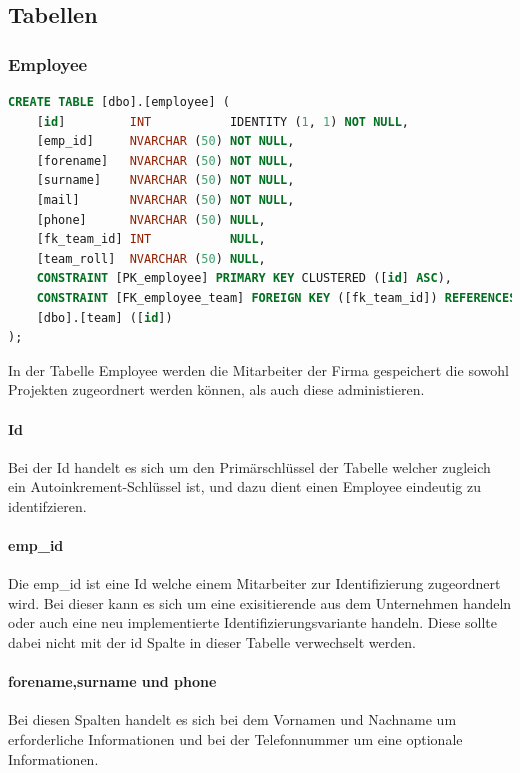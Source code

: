\documentclass{article}
\begin{document}
\newpage

\subsection{Tabellen}

\subsubsection{Employee}
\label{subsubsec:Employee}
\begin{lstlisting}[language=Sql, caption= Create Table Statement für Employee Table]
    CREATE TABLE [dbo].[employee] (
    [id]         INT           IDENTITY (1, 1) NOT NULL,
    [emp_id]     NVARCHAR (50) NOT NULL,
    [forename]   NVARCHAR (50) NOT NULL,
    [surname]    NVARCHAR (50) NOT NULL,
    [mail]       NVARCHAR (50) NOT NULL,
    [phone]      NVARCHAR (50) NULL,
    [fk_team_id] INT           NULL,
    [team_roll]  NVARCHAR (50) NULL,
    CONSTRAINT [PK_employee] PRIMARY KEY CLUSTERED ([id] ASC),
    CONSTRAINT [FK_employee_team] FOREIGN KEY ([fk_team_id]) REFERENCES 
    [dbo].[team] ([id])
);
        \end{lstlisting}

In der Tabelle Employee werden die Mitarbeiter der Firma gespeichert die sowohl
Projekten zugeordnert werden können, als auch diese administieren.
\paragraph{Id}
\label{paragraph:id}
Bei der Id handelt es sich um den Primärschlüssel der Tabelle welcher zugleich
ein Autoinkrement-Schlüssel ist, und dazu dient einen Employee eindeutig zu
identifzieren.

\paragraph{emp\_id} Die emp\_id ist eine Id welche einem Mitarbeiter zur Identifizierung
zugeordnert wird. Bei dieser kann es sich um eine exisitierende aus dem
Unternehmen handeln oder auch eine neu implementierte Identifizierungsvariante
handeln. Diese sollte dabei nicht mit der id Spalte in dieser Tabelle
verwechselt werden.

\paragraph{forename,surname und phone} Bei diesen Spalten handelt es sich bei dem Vornamen und Nachname um
erforderliche Informationen und bei der Telefonnummer um eine optionale
Informationen.
\end{document}
